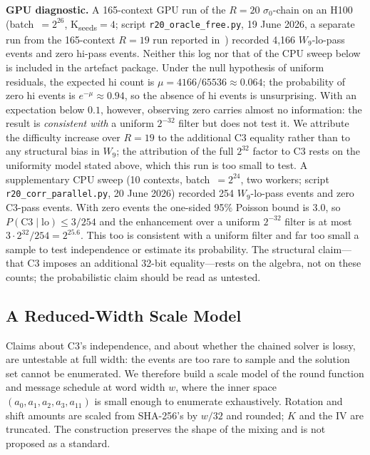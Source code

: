 \documentclass[11pt,a4paper]{article}
\begin{document}
\textbf{GPU diagnostic.}
A 165-context GPU run of the $R=20$ $\sigma_0$-chain on an H100 (batch~$=2^{26}$,
K\textsubscript{seeds}$=4$; script \texttt{r20\_oracle\_free.py}, 19 June
2026, a separate run from the 165-context $R{=}19$ run reported
in~\cite{Basra2026R19}) recorded 4{,}166 $W_9$-lo-pass events and zero
hi-pass events.  Neither this log nor that of the CPU sweep below is
included in the artefact package.
Under the null hypothesis of uniform residuals, the expected hi count is $\mu =
4166/65536 \approx 0.064$; the probability of zero hi events is $e^{-\mu}\approx 0.94$,
so the absence of hi events is unsurprising.  With an expectation
below $0.1$, however, observing zero carries almost no information: the result
is \emph{consistent with} a uniform $2^{-32}$ filter but does not test it.
We attribute the difficulty increase over $R=19$ to the additional
C3 equality rather than to any structural bias in $W_9$; the attribution of the
full $2^{32}$ factor to C3 rests on the uniformity model stated above, which
this run is too small to test.
A supplementary CPU sweep (10 contexts, batch~$=2^{24}$, two workers;
script \texttt{r20\_corr\_parallel.py}, 20 June 2026) recorded 254
$W_9$-lo-pass events and zero C3-pass events.  With zero events the
one-sided 95\% Poisson bound is $3.0$, so $P(\mathrm{C3}\mid\mathrm{lo})
\le 3/254$ and the enhancement over a uniform $2^{-32}$ filter is at most
$3\cdot 2^{32}/254 = 2^{25.6}$.  This too is consistent with a uniform
filter and far too small a sample to test independence or estimate its
probability.  The structural claim---that C3 imposes an additional 32-bit
equality---rests on the algebra, not on these counts; the probabilistic claim
should be read as untested.

\subsection{A Reduced-Width Scale Model}
\label{sec:redwidth}

Claims about C3's independence, and about whether the chained solver is lossy,
are untestable at full width: the events are too rare to sample and the
solution set cannot be enumerated.  We therefore build a scale model of the
round function and message schedule at word width $w$, where the inner space
$(a_0,a_1,a_2,a_3,a_{11})$ is small enough to enumerate exhaustively.
Rotation and shift amounts are scaled from SHA-256's by $w/32$ and rounded; $K$
and the IV are truncated.  The construction preserves the shape of the mixing
and is not proposed as a standard.
\end{document}
